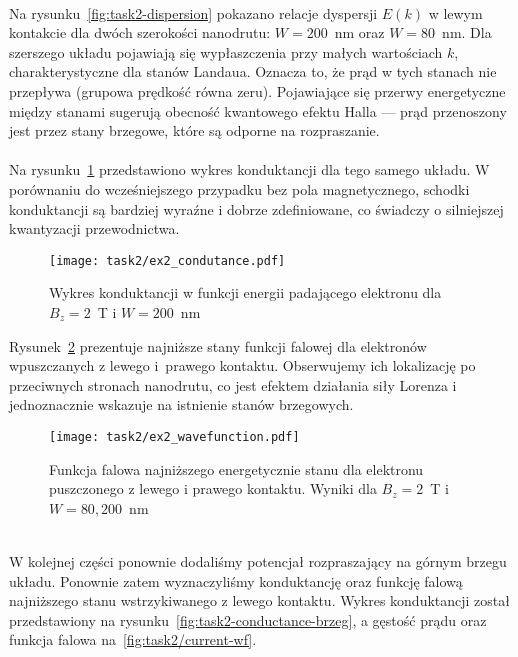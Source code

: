 \documentclass{article}
\begin{document}
\\
Na rysunku~\ref{fig:task2-dispersion} pokazano relacje dyspersji $E(k)$ w lewym kontakcie dla dwóch szerokości nanodrutu: $W = 200$~nm oraz $W = 80$~nm. 
Dla szerszego układu pojawiają się wypłaszczenia przy małych wartościach $k$, charakterystyczne dla stanów Landaua.
Oznacza to, że prąd w tych stanach nie przepływa (grupowa prędkość równa zeru). 
Pojawiające się przerwy energetyczne między stanami sugerują obecność kwantowego efektu Halla — prąd przenoszony jest przez stany brzegowe, które są odporne na rozpraszanie.\\
\\
Na rysunku~\ref{fig:task2-conductance} przedstawiono wykres konduktancji dla tego samego układu.
W porównaniu do wcześniejszego przypadku bez pola magnetycznego, schodki konduktancji są bardziej wyraźne i dobrze zdefiniowane, co świadczy o silniejszej kwantyzacji przewodnictwa.
\begin{figure}[htp!]
    \centering
    \texttt{[image: task2/ex2\_condutance.pdf]}
    \caption{Wykres konduktancji w funkcji energii padającego elektronu dla $B_z=2$~T i $W = 200$~nm}
    \label{fig:task2-conductance}
\end{figure}
Rysunek~\ref{fig:task2-wavefunction} prezentuje najniższe stany funkcji falowej dla elektronów wpuszczanych z lewego i~prawego kontaktu. 
Obserwujemy ich lokalizację po przeciwnych stronach nanodrutu, co jest efektem działania siły Lorenza i jednoznacznie wskazuje na istnienie stanów brzegowych. \\
\begin{figure}[htp!]
    \centering
    \texttt{[image: task2/ex2\_wavefunction.pdf]}
    \caption{Funkcja falowa najniższego energetycznie stanu dla elektronu puszczonego z lewego i prawego kontaktu.
    Wyniki dla $B_z=2$~T i $W = 80, 200$~nm}
    \label{fig:task2-wavefunction}
\end{figure}
\\
W kolejnej części ponownie dodaliśmy potencjał rozpraszający na górnym brzegu układu.
Ponownie zatem wyznaczyliśmy konduktancję oraz funkcję falową najniższego stanu wstrzykiwanego z lewego kontaktu.
Wykres konduktancji został przedstawiony na rysunku~\ref{fig:task2-conductance-brzeg}, a gęstość prądu oraz funkcja falowa na~\ref{fig:task2/current-wf}.
\end{document}
